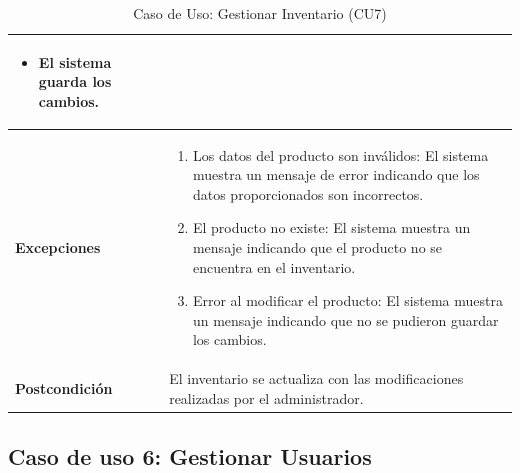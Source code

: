 \documentclass{article}
\begin{document}
\begin{table}[H]
\begin{tabular}{|p{3.5cm}|p{10cm}|}
\begin{enumerate}
\begin{itemize}
            \item El sistema guarda los cambios.
        \end{itemize}
    \end{enumerate} \\ \hline    
    \textbf{Excepciones}   & 
    \begin{enumerate}
        \item Los datos del producto son inválidos: El sistema muestra un mensaje de error indicando que los datos proporcionados son incorrectos.
        \item El producto no existe: El sistema muestra un mensaje indicando que el producto no se encuentra en el inventario.
        \item Error al modificar el producto: El sistema muestra un mensaje indicando que no se pudieron guardar los cambios.
    \end{enumerate} \\ \hline
    \textbf{Postcondición} & 
    El inventario se actualiza con las modificaciones realizadas por el administrador. \\ \hline
    \end{tabular}
    \caption{Caso de Uso: Gestionar Inventario (CU7)}
    \label{tab:cu7}
\end{table}


\subsection{Caso de uso 6: Gestionar Usuarios}
\end{document}
